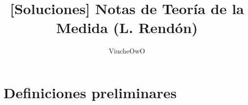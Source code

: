 \documentclass[spanish,12pt,a4paper,openany]{book}
\title{[Soluciones] Notas de Teoría de la Medida (L. Rendón)}
\author{ViucheOwO}
\begin{document}
\begin{titlepage}
	\maketitle
		
		
\end{titlepage}
\tableofcontents
\chapter{Definiciones preliminares}
\end{document}

